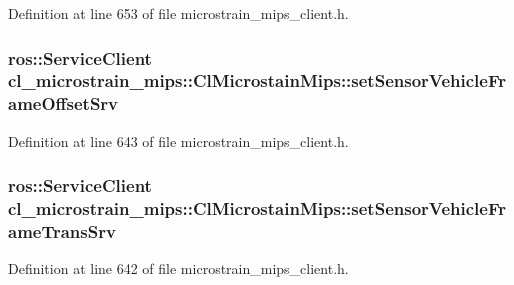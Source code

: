 Definition at line 653 of file microstrain\+\_\+mips\+\_\+client.\+h.

\subsubsection[{\texorpdfstring{set\+Sensor\+Vehicle\+Frame\+Offset\+Srv}{setSensorVehicleFrameOffsetSrv}}]{\setlength{\rightskip}{0pt plus 5cm}ros\+::\+Service\+Client cl\+\_\+microstrain\+\_\+mips\+::\+Cl\+Microstain\+Mips\+::set\+Sensor\+Vehicle\+Frame\+Offset\+Srv\hspace{0.3cm}{\ttfamily [protected]}}\hypertarget{classcl__microstrain__mips_1_1ClMicrostainMips_a977cce1917e12d96f614266baa4ae55d}{}\label{classcl__microstrain__mips_1_1ClMicrostainMips_a977cce1917e12d96f614266baa4ae55d}


Definition at line 643 of file microstrain\+\_\+mips\+\_\+client.\+h.

\subsubsection[{\texorpdfstring{set\+Sensor\+Vehicle\+Frame\+Trans\+Srv}{setSensorVehicleFrameTransSrv}}]{\setlength{\rightskip}{0pt plus 5cm}ros\+::\+Service\+Client cl\+\_\+microstrain\+\_\+mips\+::\+Cl\+Microstain\+Mips\+::set\+Sensor\+Vehicle\+Frame\+Trans\+Srv\hspace{0.3cm}{\ttfamily [protected]}}\hypertarget{classcl__microstrain__mips_1_1ClMicrostainMips_ac020b44e78addaa26beb44081d99f194}{}\label{classcl__microstrain__mips_1_1ClMicrostainMips_ac020b44e78addaa26beb44081d99f194}


Definition at line 642 of file microstrain\+\_\+mips\+\_\+client.\+h.

